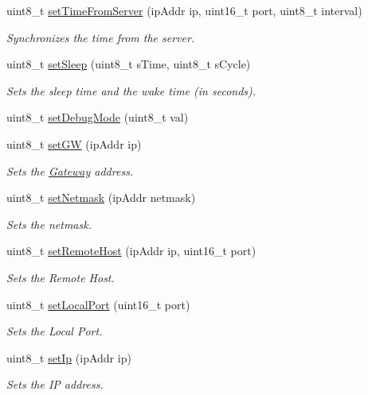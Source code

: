 \begin{DoxyCompactItemize}
uint8\+\_\+t \hyperlink{class_wasp_w_i_f_i_aeee6743fc13ef36b6634f4d81d561dc5}{set\+Time\+From\+Server} (ip\+Addr ip, uint16\+\_\+t port, uint8\+\_\+t interval)
\begin{DoxyCompactList}\small\item\em Synchronizes the time from the server. \end{DoxyCompactList}\item 
uint8\+\_\+t \hyperlink{class_wasp_w_i_f_i_a339bb1b6719c55a2279b2b9e57ca7902}{set\+Sleep} (uint8\+\_\+t s\+Time, uint8\+\_\+t s\+Cycle)
\begin{DoxyCompactList}\small\item\em Sets the sleep time and the wake time (in seconds). \end{DoxyCompactList}\item 
uint8\+\_\+t \hyperlink{class_wasp_w_i_f_i_afc99c2f1ebffac0686e061635eadc2ab}{set\+Debug\+Mode} (uint8\+\_\+t val)
\item 
uint8\+\_\+t \hyperlink{class_wasp_w_i_f_i_a97cabbedcce107175cc6cc472fa9054c}{set\+GW} (ip\+Addr ip)
\begin{DoxyCompactList}\small\item\em Sets the \hyperlink{class_gateway}{Gateway} address. \end{DoxyCompactList}\item 
uint8\+\_\+t \hyperlink{class_wasp_w_i_f_i_a9c18acb0df5932a4effbd177fb6d2050}{set\+Netmask} (ip\+Addr netmask)
\begin{DoxyCompactList}\small\item\em Sets the netmask. \end{DoxyCompactList}\item 
uint8\+\_\+t \hyperlink{class_wasp_w_i_f_i_aca1c5c2787170645b4eb104b7c4dab21}{set\+Remote\+Host} (ip\+Addr ip, uint16\+\_\+t port)
\begin{DoxyCompactList}\small\item\em Sets the Remote Host. \end{DoxyCompactList}\item 
uint8\+\_\+t \hyperlink{class_wasp_w_i_f_i_a0cdbe1677ec7ed423c73372566d8c07a}{set\+Local\+Port} (uint16\+\_\+t port)
\begin{DoxyCompactList}\small\item\em Sets the Local Port. \end{DoxyCompactList}\item 
uint8\+\_\+t \hyperlink{class_wasp_w_i_f_i_a1d2eea150d41b37aa4dfb3dce097814d}{set\+Ip} (ip\+Addr ip)
\begin{DoxyCompactList}\small\item\em Sets the IP address. \end{DoxyCompactList}\item 

\end{DoxyCompactItemize}

